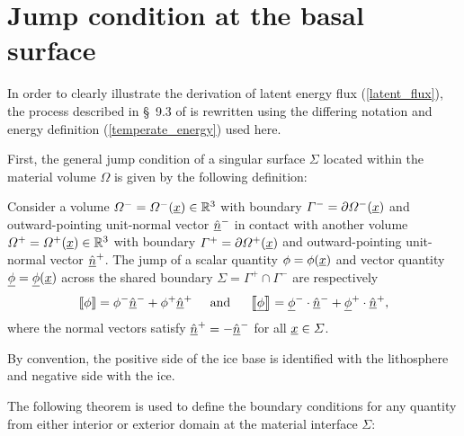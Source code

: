 
\chapter{Jump condition at the basal surface}

In order to clearly illustrate the derivation of latent energy flux (\ref{latent_flux}), the process described in \S~9.3 of \citet{greve_2009} is rewritten using the differing notation and energy definition (\ref{temperate_energy}) used here.

First, the general jump condition of a singular surface $\Sigma$ located within the material volume $\Omega$ is given by the following definition:

\begin{definition}
\label{def_jump}
Consider a volume $\varOmega^- = \varOmega^-(\underline{x}) \in \mathbb{R}^3$ with boundary $\varGamma^- = \partial \varOmega^-(\underline{x})$ and outward-pointing unit-normal vector $\underline{\hat{n}}^-$ in contact with another volume $\varOmega^+ = \varOmega^+(\underline{x}) \in \mathbb{R}^3$ with boundary $\varGamma^+ = \partial \varOmega^+(\underline{x})$ and outward-pointing unit-normal vector $\underline{\hat{n}}^+$. 
The jump of a scalar quantity $\phi = \phi(\underline{x})$ and vector quantity $\underline{\phi} = \underline{\phi}(\underline{x})$ across the shared boundary $\Sigma = \Gamma^+ \cap \Gamma^-$ are respectively
\begin{align*}
  \left\llbracket {\phi} \right\rrbracket = \phi^- \underline{\hat{n}}^- + \phi^+ \underline{\hat{n}}^+
  \hspace{5mm}
  \text{and}
  \hspace{5mm}
  \left\llbracket {\underline{\phi}} \right\rrbracket = \underline{\phi}^- \cdot \underline{\hat{n}}^- + \underline{\phi}^+ \cdot \underline{\hat{n}}^+,
\end{align*}
where the normal vectors satisfy $\underline{\hat{n}}^+ = -\underline{\hat{n}}^-$ for all $\underline{x} \in \varSigma$.
\end{definition}

\begin{remark}
By convention, the positive side of the ice base is identified with the lithosphere and negative side with the ice.
\end{remark}

The following theorem is used to define the boundary conditions for any quantity from either interior or exterior domain at the material interface $\Sigma$:

